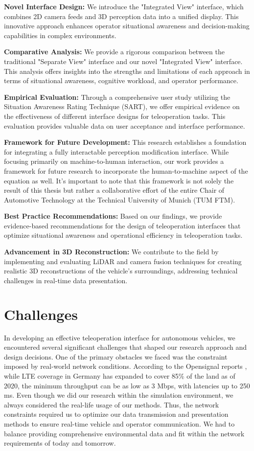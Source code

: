 \textbf{Novel Interface Design:}
We introduce the "Integrated View" interface, which combines 2D camera feeds and 3D perception data into a unified display. This innovative approach
enhances operator situational awareness and decision-making capabilities in complex environments.

\textbf{Comparative Analysis:}
We provide a rigorous comparison between the traditional
"Separate View" interface and our novel "Integrated View" interface. This analysis offers
insights into the strengths and limitations of each approach in terms of situational
awareness, cognitive workload, and operator performance.

\textbf{Empirical Evaluation:}
Through a comprehensive user study utilizing the Situation
Awareness Rating Technique (SART)\cite{taylor1990sart}, we offer empirical evidence on the effectiveness of different interface designs for teleoperation tasks. This evaluation provides
valuable data on user acceptance and interface performance.

\textbf{Framework for Future Development:}
This research establishes a foundation for
integrating a fully interactable perception modification interface. While focusing
primarily on machine-to-human interaction, our work provides a framework for future
research to incorporate the human-to-machine aspect of the equation as well. It's
important to note that this framework is not solely the result of this thesis but rather a collaborative effort of the entire Chair of Automotive Technology at the Technical
University of Munich (TUM FTM).

\textbf{Best Practice Recommendations:}
Based on our findings, we provide evidence-based recommendations for the design of teleoperation interfaces that optimize situational awareness and operational efficiency in teleoperation tasks.

\textbf{Advancement in 3D Reconstruction:}
We contribute to the field by implementing and evaluating LiDAR and camera fusion techniques for creating realistic 3D reconstructions of the vehicle's surroundings, addressing technical challenges in real-time data presentation.

\section{Challenges}

In developing an effective teleoperation interface for autonomous vehicles, we encountered several significant challenges that shaped our research approach and design decisions.
One of the primary obstacles we faced was the constraint imposed by real-world network conditions.
According to the Opensignal reports \cite{opensignal2020germany}, while LTE coverage in Germany has expanded to cover 85\% of the land as of 2020,
the minimum throughput can be as low as 3 Mbps, with latencies up to 250 ms. Even though we did our research within the simulation environment,
we always considered the real-life usage of our methods. Thus, the network constraints required us to optimize our data transmission and presentation methods to ensure
real-time vehicle and operator communication. We had to balance providing comprehensive environmental data and fit within the network requirements of today and tomorrow.

